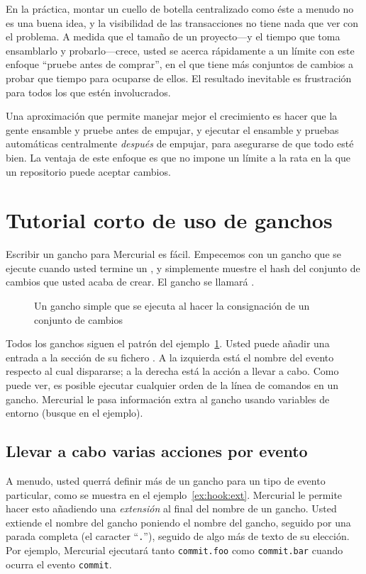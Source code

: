En la práctica, montar un cuello de botella centralizado como éste a
menudo no es una buena idea, y la visibilidad de las transacciones no
tiene nada que ver con el problema. A medida que el tamaño de un
proyecto---y el tiempo que toma ensamblarlo y probarlo---crece, usted
se acerca rápidamente a un límite con este enfoque ``pruebe antes de
comprar'', en el que tiene más conjuntos de cambios a probar que
tiempo para ocuparse de ellos. El resultado inevitable es frustración
para todos los que estén involucrados.

Una aproximación que permite manejar mejor el crecimiento es hacer que
la gente ensamble y pruebe antes de empujar, y ejecutar el ensamble y
pruebas automáticas centralmente \emph{después} de empujar, para
asegurarse de que todo esté bien. La ventaja de este enfoque es que no
impone un límite a la rata en la que un repositorio puede aceptar
cambios.

\section{Tutorial corto de uso de ganchos}
\label{sec:hook:simple}

Escribir un gancho para Mercurial es fácil. Empecemos con un gancho
que se ejecute cuando usted termine un , y simplemente
muestre el hash del conjunto de cambios que usted acaba de crear. El
gancho se llamará .

\begin{figure}[ht]
  \caption{Un gancho simple que se ejecuta al hacer la consignación de
  un conjunto de cambios}
  \label{ex:hook:init}
\end{figure}

Todos los ganchos siguen el patrón del ejemplo~\ref{ex:hook:init}.
Usted puede añadir una entrada a la sección  de su
fichero \hgrc.  A la izquierda está el nombre del evento respecto al
cual dispararse; a la derecha está la acción a llevar a cabo. Como
puede ver, es posible ejecutar cualquier orden de la línea de comandos
en un gancho. Mercurial le pasa información extra al gancho usando
variables de entorno (busque  en el ejemplo).

\subsection{Llevar a cabo varias acciones por evento}

A menudo, usted querrá definir más de un gancho para un tipo de evento
particular, como se muestra en el ejemplo~\ref{ex:hook:ext}. 
Mercurial le permite hacer esto añadiendo una \emph{extensión} al
final del nombre de un gancho. Usted extiende el nombre del gancho
poniendo el nombre del gancho, seguido por una parada completa (el
caracter ``\texttt{.}''), seguido de algo más de texto de su elección.
Por ejemplo, Mercurial ejecutará tanto \texttt{commit.foo} como
\texttt{commit.bar} cuando ocurra el evento \texttt{commit}.

